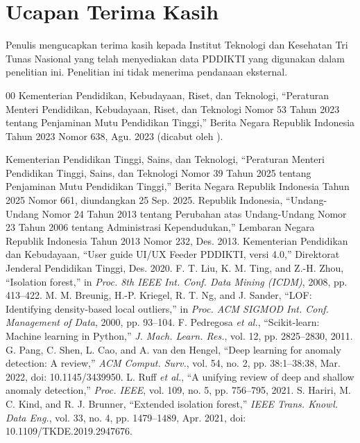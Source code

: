 \documentclass[conference]{IEEEtran}
\begin{document}
\section*{Ucapan Terima Kasih}
{\raggedright Penulis mengucapkan terima kasih kepada Institut Teknologi dan Kesehatan Tri Tunas Nasional yang telah menyediakan data PDDIKTI yang digunakan dalam penelitian ini. Penelitian ini tidak menerima pendanaan eksternal.\par}

\begin{thebibliography}{00}
 Kementerian Pendidikan, Kebudayaan, Riset, dan Teknologi, ``Peraturan Menteri Pendidikan, Kebudayaan, Riset, dan Teknologi Nomor 53 Tahun 2023 tentang Penjaminan Mutu Pendidikan Tinggi,'' Berita Negara Republik Indonesia Tahun 2023 Nomor 638, Agu. 2023 (dicabut oleh \cite{permendiktisaintek39_2025}).
 \raggedright Kementerian Pendidikan Tinggi, Sains, dan Teknologi, ``Peraturan Menteri Pendidikan Tinggi, Sains, dan Teknologi Nomor 39 Tahun 2025 tentang Penjaminan Mutu Pendidikan Tinggi,'' Berita Negara Republik Indonesia Tahun 2025 Nomor 661, diundangkan 25 Sep. 2025.
 Republik Indonesia, ``Undang-Undang Nomor 24 Tahun 2013 tentang Perubahan atas Undang-Undang Nomor 23 Tahun 2006 tentang Administrasi Kependudukan,'' Lembaran Negara Republik Indonesia Tahun 2013 Nomor 232, Des. 2013.
 Kementerian Pendidikan dan Kebudayaan, ``User guide UI/UX Feeder PDDIKTI, versi 4.0,'' Direktorat Jenderal Pendidikan Tinggi, Des. 2020.
 F. T. Liu, K. M. Ting, and Z.-H. Zhou, ``Isolation forest,'' in \textit{Proc. 8th IEEE Int. Conf. Data Mining (ICDM)}, 2008, pp. 413--422.
 M. M. Breunig, H.-P. Kriegel, R. T. Ng, and J. Sander, ``LOF: Identifying density-based local outliers,'' in \textit{Proc. ACM SIGMOD Int. Conf. Management of Data}, 2000, pp. 93--104.
 F. Pedregosa \textit{et al.}, ``Scikit-learn: Machine learning in Python,'' \textit{J. Mach. Learn. Res.}, vol. 12, pp. 2825--2830, 2011.
 G. Pang, C. Shen, L. Cao, and A. van den Hengel, ``Deep learning for anomaly detection: A review,'' \textit{ACM Comput. Surv.}, vol. 54, no. 2, pp. 38:1--38:38, Mar. 2022, doi: 10.1145/3439950.
 L. Ruff \textit{et al.}, ``A unifying review of deep and shallow anomaly detection,'' \textit{Proc. IEEE}, vol. 109, no. 5, pp. 756--795, 2021.
 S. Hariri, M. C. Kind, and R. J. Brunner, ``Extended isolation forest,'' \textit{IEEE Trans. Knowl. Data Eng.}, vol. 33, no. 4, pp. 1479--1489, Apr. 2021, doi: 10.1109/TKDE.2019.2947676.

\end{thebibliography}
\end{document}

